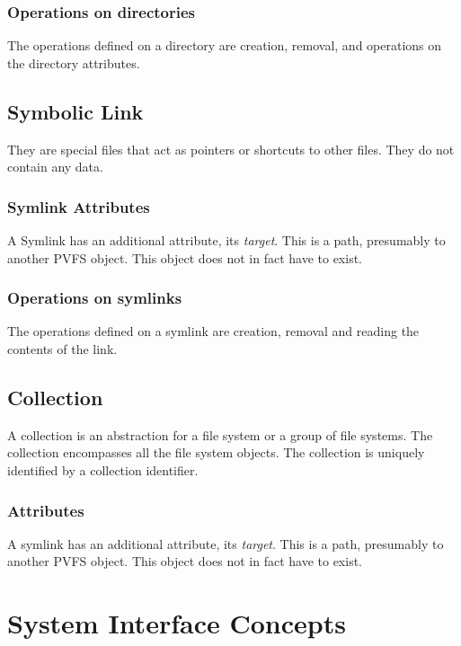 \documentclass[11pt, letterpaper]{article}
\begin{document}
\subsubsection{Operations on directories}

The operations defined on a directory are creation, removal, and
operations on the directory attributes.

%
%
\subsection{Symbolic Link}

They are special files that act as pointers or shortcuts to other files.
They do not contain any data.

\subsubsection{Symlink Attributes}

A Symlink has an additional attribute, its {\em target}.  This is a
path, presumably to another PVFS object.  This object does not in fact
have to exist.

\subsubsection{Operations on symlinks}

The operations defined on a symlink are creation, removal and reading
the contents of the link.

%
%
\subsection{Collection}

A collection is an abstraction for a file system or a group of file
systems. The collection encompasses all the file system objects. The
collection is uniquely identified by a collection identifier.

\subsubsection{Attributes}

A symlink has an additional attribute, its {\em target}.  This is a
path, presumably to another PVFS object.  This object does not in fact
have to exist.


\section{System Interface Concepts}
\end{document}

